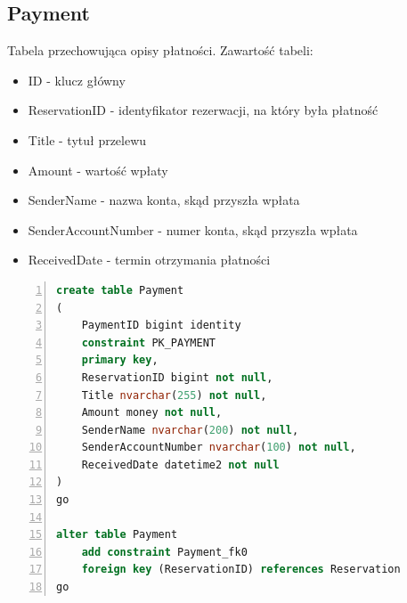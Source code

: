 \documentclass[]{article}
\begin{document}
	\subsection{Payment}
	Tabela przechowująca opisy płatności. Zawartość tabeli:
	\begin{itemize}
		\item ID - klucz główny
		\item ReservationID - identyfikator rezerwacji, na który była płatność
		\item Title - tytuł przelewu
		\item Amount - wartość wpłaty
		\item SenderName - nazwa konta, skąd przyszła wpłata
		\item SenderAccountNumber - numer konta, skąd przyszła wpłata
		\item ReceivedDate - termin otrzymania płatności
	\end{itemize}
	\begin{lstlisting}[language=SQL,
						showspaces=false,
						basicstyle=\ttfamily,
						numbers=left,
						numberstyle=\tiny,
						backgroundcolor=\color{lightg},
						keywordstyle=\color{lightblue},
						commentstyle=\color{gray}]
create table Payment
(
	PaymentID bigint identity
	constraint PK_PAYMENT
	primary key,
	ReservationID bigint not null,
	Title nvarchar(255) not null,
	Amount money not null,
	SenderName nvarchar(200) not null,
	SenderAccountNumber nvarchar(100) not null,
	ReceivedDate datetime2 not null
)
go

alter table Payment
	add constraint Payment_fk0
	foreign key (ReservationID) references Reservation
go

	\end{lstlisting}
\end{document}

